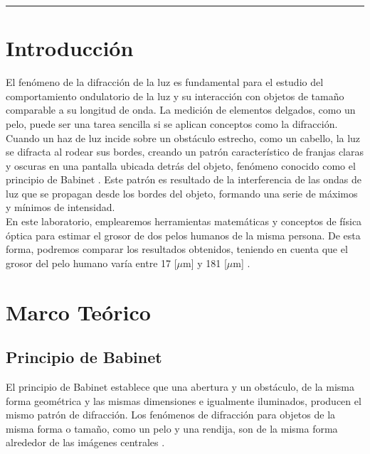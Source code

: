 \documentclass[10pt,a4paper]{article}
\begin{document}
	\begin{center}
		\textcolor{pinegreen}{\rule{150mm}{0.8mm}}
	\end{center}
	
	\begin{multicols}{2}
		\section{Introducción}
		El fenómeno de la difracción de la luz es fundamental para el estudio del comportamiento ondulatorio de la luz y su interacción con objetos de tamaño comparable a su longitud de onda. La medición de elementos delgados, como un pelo, puede ser una tarea sencilla si se aplican conceptos como la difracción.\\
		
		 Cuando un haz de luz incide sobre un obstáculo estrecho, como un cabello, la luz se difracta al rodear sus bordes, creando un patrón característico de franjas claras y oscuras en una pantalla ubicada detrás del objeto, fenómeno conocido como el principio de Babinet \cite{babinet}. Este patrón es resultado de la interferencia de las ondas de luz que se propagan desde los bordes del objeto, formando una serie de máximos y mínimos de intensidad. \\
		
		En este laboratorio, emplearemos herramientas matemáticas y conceptos de física óptica para estimar el grosor de dos pelos humanos de la misma persona.  De esta forma, podremos comparar los resultados obtenidos, teniendo en cuenta que el grosor del pelo humano varía entre 17 [$\mu$m] y 181 [$\mu$m] \cite{wikiPELO}. 
			
		\section{Marco Teórico}
		\subsection*{Principio de Babinet}
		El principio de Babinet establece que una abertura y un obstáculo, de la misma forma geométrica y las mismas dimensiones e igualmente iluminados, producen el mismo patrón de difracción.  Los fenómenos de difracción para objetos de la misma forma o tamaño, como un pelo y una rendija, son de la misma forma alrededor de las imágenes centrales \cite{babinet}. \\
		

\end{multicols}
\end{document}
